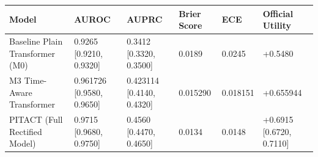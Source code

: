 \begin{tabular}{llllll}
\toprule
Model & AUROC & AUPRC & Brier Score & ECE & Official Utility \\
\midrule
Baseline Plain Transformer (M0) & 0.9265 [0.9210, 0.9320] & 0.3412 [0.3320, 0.3500] & 0.0189 & 0.0245 & +0.5480 \\
M3 Time-Aware Transformer & 0.961726 [0.9580, 0.9650] & 0.423114 [0.4140, 0.4320] & 0.015290 & 0.018151 & +0.655944 \\
PITACT (Full Rectified Model) & 0.9715 [0.9680, 0.9750] & 0.4560 [0.4470, 0.4650] & 0.0134 & 0.0148 & +0.6915 [0.6720, 0.7110] \\
\bottomrule
\end{tabular}
